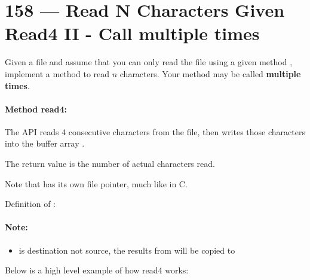 \section{158 --- Read N Characters Given Read4 II - Call multiple times }
Given a file and assume that you can only read the file using a given method , implement a method  to read $n$ characters. Your method  may be called \textbf{multiple times}.

\paragraph{Method read4:}

\begin{flushleft}
The API  reads 4 consecutive characters from the file, then writes those characters into the buffer array .

The return value is the number of actual characters read.

Note that  has its own file pointer, much like  in C.

Definition of : 
\end{flushleft}

\paragraph{Note:} 

\begin{itemize}
\item {} is destination not source, the results from  will be copied to 
\end{itemize}

Below is a high level example of how read4 works:

\begin{flushleft}




\end{flushleft}
 
